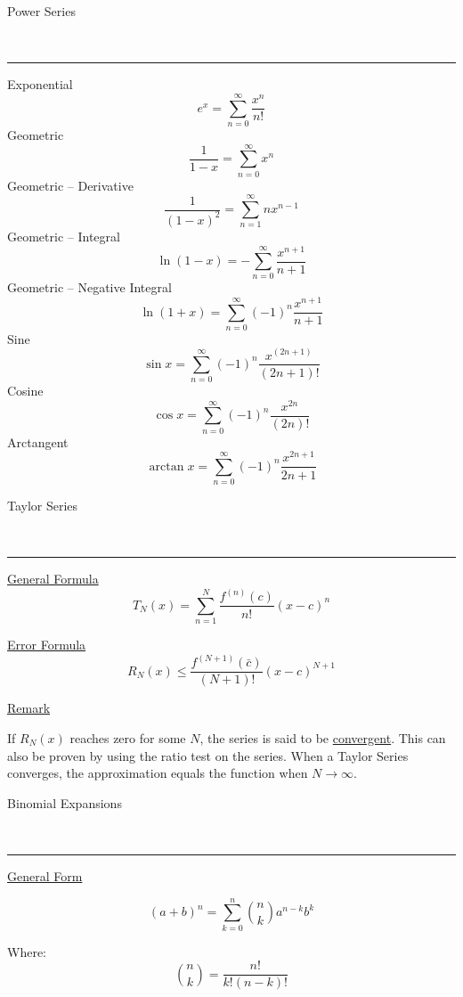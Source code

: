 \documentclass{article}
\begin{document}
\begin{large}
    Power Series
\end{large}\\
\noindent\rule{\textwidth}{0.5pt}
\begin{multicols}{3}
\noindent
\begin{center}
Exponential
\[
    e^x = \sum_{n = 0}^\infty\frac{x^n}{n!}
\]
Geometric
\[
    \frac{1}{1-x}=\sum_{n = 0}^\infty x^n
\]
\vfill\null\columnbreak
Geometric -- Derivative
\[
    \frac{1}{(1-x)^2}=\sum_{n = 1}^\infty nx^{n-1}
\]
Geometric -- Integral
\[
    \ln(1-x) = -\sum_{n = 0}^\infty\frac{x^{n+1}}{n+1}
\]
Geometric -- Negative Integral
\[
    \ln(1+x) = \sum_{n = 0}^\infty(-1)^n\frac{x^{n+1}}{n+1}
\]
\vfill\null\columnbreak
Sine
\[
    \sin x = \sum_{n = 0}^\infty(-1)^n\frac{x^{(2n+1)}}{(2n+1)!}
\]
Cosine
\[
    \cos x = \sum_{n = 0}^\infty (-1)^n\frac{x^{2n}}{(2n)!}
\]
Arctangent
\[
    \arctan x = \sum_{n = 0}^\infty (-1)^n \frac{x^{2n+1}}{2n+1}
\]
\end{center}
\end{multicols}

\begin{large}
    Taylor Series
\end{large}\\
\noindent\rule{\textwidth}{0.5pt}
\begin{multicols}{3}
\noindent

\begin{center}
    \underline{General Formula}
    \[
        T_N(x) = \sum_{n = 1}^N\frac{f^{(n)}(c)}{n!}(x-c)^n
    \]
    
    \vfill\null\columnbreak
    
    \underline{Error Formula}
    \[
        R_N(x) \leq \frac{f^{(N+1)}(\bar{c})}{(N+1)!}(x-c)^{N+1}
    \]
    
    \vfill\null\columnbreak
    
    \underline{Remark}\\
        \item If $R_N(x)$ reaches zero for some $N$, the series is said to be \underline{convergent}. This can also be proven by using the ratio test on the series. When a Taylor Series converges, the approximation equals the function when $N \to \infty$.
\end{center}

\end{multicols}

\begin{large}
    Binomial Expansions
\end{large}\\
\noindent\rule{\textwidth}{0.5pt}

\begin{multicols}{2}
\begin{center}
\underline{General Form}

\[
    (a+b)^n = \sum_{k = 0}^n {n \choose k} a^{n-k}b^k
\]

Where:
\[
    {n \choose k} = \frac{n!}{k!(n-k)!}
\]
\end{center}
\end{multicols}
\end{document}
